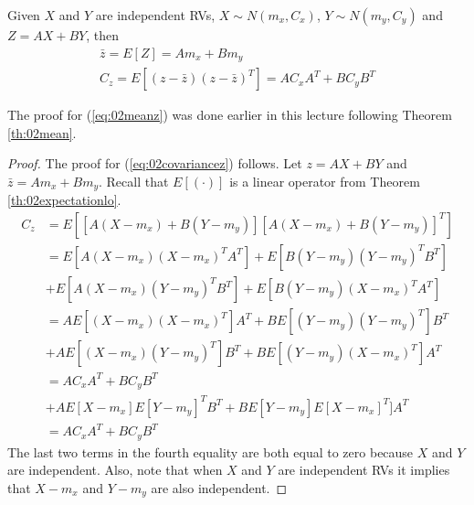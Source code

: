 \documentclass[lecture,12pt,]{pcms-l}
\begin{document}
\begin{theorem}
\label{th:02covariance}
Given $X$ and $Y$ are independent RVs, $X\sim N(m_x,C_x)$, $Y\sim N(m_y,C_y)$ and $Z=AX+BY$, then
\begin{align}
\label{eq:02meanz}
\bar{z} = E[Z] = Am_x+Bm_y \\
\label{eq:02covariancez}
C_z = E[(z-\bar{z})(z-\bar{z})^T] = AC_xA^T + BC_yB^T
\end{align}
\end{theorem}
The proof for (\ref{eq:02meanz}) was done earlier in this lecture following Theorem \ref{th:02mean}.
\begin{proof}
The proof for (\ref{eq:02covariancez}) follows. Let $z=AX+BY$ and $\bar{z}=Am_x+Bm_y$. Recall that $E[(\cdot)]$ is a linear operator from Theorem \ref{th:02expectationlo}.
\begin{align*}
C_z &= E\left[[A(X-m_x)+B(Y-m_y)][A(X-m_x)+B(Y-m_y)]^T\right] \\
&= E[A(X-m_x)(X-m_x)^TA^T] + E[B(Y-m_y)(Y-m_y)^TB^T] \\
&+ E[A(X-m_x)(Y-m_y)^TB^T] + E[B(Y-m_y)(X-m_x)^TA^T] \\
&= AE[(X-m_x)(X-m_x)^T]A^T + BE[(Y-m_y)(Y-m_y)^T]B^T \\
&+ AE[(X-m_x)(Y-m_y)^T]B^T + BE[(Y-m_y)(X-m_x)^T]A^T \\
&= AC_xA^T + BC_yB^T \\
&+ AE[X-m_x]E[Y-m_y]^TB^T + BE[Y-m_y]E[X-m_x]^T]A^T \\
&= AC_xA^T + BC_yB^T
\end{align*}
The last two terms in the fourth equality are both equal to zero because $X$ and $Y$ are independent. Also, note that when $X$ and $Y$ are independent RVs it implies that $X-m_x$ and $Y-m_y$ are also independent.
\end{proof}
\end{document}
